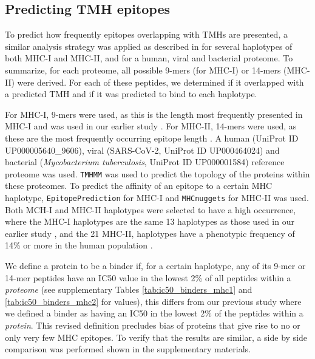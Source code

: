\subsection{Predicting TMH epitopes}

To predict how frequently epitopes overlapping with TMHs are presented,
a similar analysis strategy was applied as described in \cite{bianchi2017} 
for several haplotypes of both MHC-I and MHC-II, 
and for a human, viral and bacterial proteome.
To summarize, for each proteome, 
all possible 9-mers (for MHC-I) or 14-mers (MHC-II) were derived. 
For each of these peptides, we determined if it overlapped with a predicted 
TMH and if it was predicted to bind to each haplotype.

For MHC-I, 9-mers were used, 
as this is the length most frequently presented in MHC-I 
and was used in our earlier study \cite{bianchi2017}. 
For MHC-II, 14-mers were used, 
as these are the most frequently occurring epitope length \cite{bergseng2015different}.
A human (UniProt ID UP000005640\_9606), 
viral (SARS-CoV-2, UniProt ID UP000464024) 
and bacterial (\emph{Mycobacterium tuberculosis}, UniProt ID UP000001584) 
reference proteome was used. 
\verb;TMHMM; \cite{krogh2001predicting} was used to predict the topology 
of the proteins within these proteomes.
To predict the affinity of an epitope to a certain MHC haplotype,
 \verb;EpitopePrediction; \cite{bianchi2017} for MHC-I 
and \verb;MHCnuggets; \cite{shao2020high} for MHC-II was used.
Both MCH-I and MHC-II haplotypes were selected to have a high occurrence,
where the MHC-I haplotypes are the same 13 haplotypes as 
those used in our earlier study \cite{bianchi2017},
and the 21 MHC-II, haplotypes have a phenotypic frequency 
of 14\% or more in the human population \cite{greenbaum2011functional}.
 
We define a protein to be a binder if, for a certain haplotype, 
any of its 9-mer or 14-mer peptides have an IC50 value in the lowest 2\% of 
all peptides within a \emph{proteome} 
(see supplementary Tables \ref{tab:ic50_binders_mhc1} and \ref{tab:ic50_binders_mhc2} for values), 
this differs from our previous study where we defined
a binder as having an IC50 in the lowest 2\% 
of the peptides within a \emph{protein}.
This revised definition precludes bias of proteins 
that give rise to no or only very few MHC epitopes.
To verify that the results are similar, a side by side comparison was performed shown in the supplementary materials.

